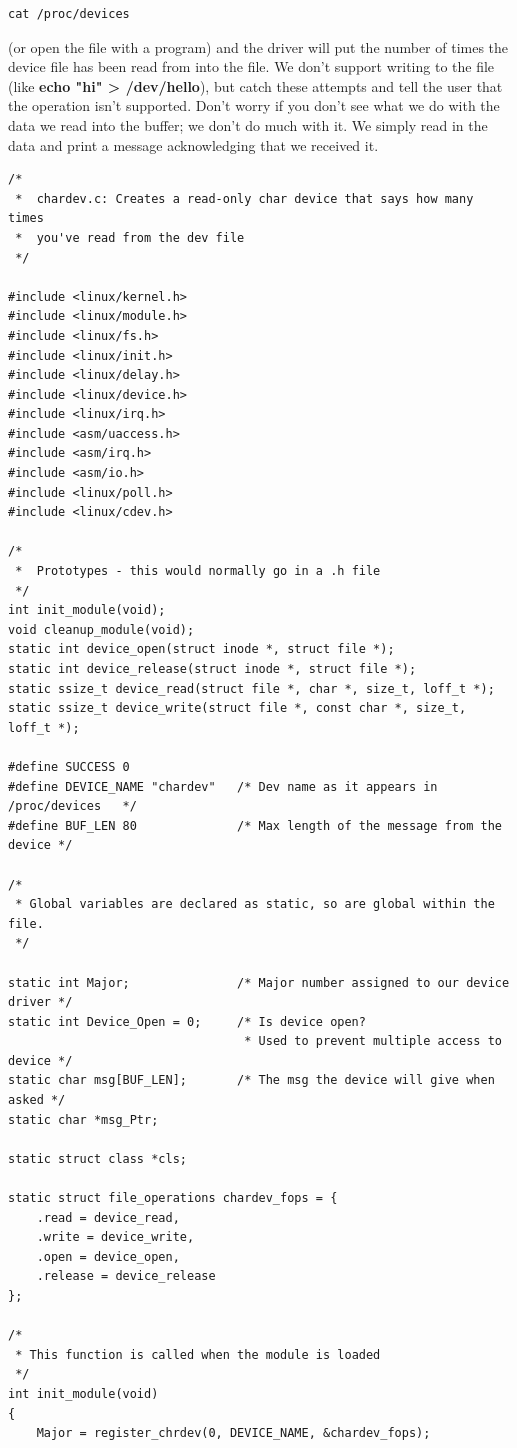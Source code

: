 \documentclass[11pt]{article}
\begin{document}
\begin{verbatim}
cat /proc/devices
\end{verbatim}

(or open the file with a program) and the driver will put the number of times the device file has been read from into the file. We don't support writing to the file (like \textbf{echo "hi" > /dev/hello}), but catch these attempts and tell the user that the operation isn't supported. Don't worry if you don't see what we do with the data we read into the buffer; we don't do much with it. We simply read in the data and print a message acknowledging that we received it.

\begin{verbatim}
/*
 *  chardev.c: Creates a read-only char device that says how many times
 *  you've read from the dev file
 */

#include <linux/kernel.h>
#include <linux/module.h>
#include <linux/fs.h>
#include <linux/init.h>
#include <linux/delay.h>
#include <linux/device.h>
#include <linux/irq.h>
#include <asm/uaccess.h>
#include <asm/irq.h>
#include <asm/io.h>
#include <linux/poll.h>
#include <linux/cdev.h>

/*
 *  Prototypes - this would normally go in a .h file
 */
int init_module(void);
void cleanup_module(void);
static int device_open(struct inode *, struct file *);
static int device_release(struct inode *, struct file *);
static ssize_t device_read(struct file *, char *, size_t, loff_t *);
static ssize_t device_write(struct file *, const char *, size_t, loff_t *);

#define SUCCESS 0
#define DEVICE_NAME "chardev"   /* Dev name as it appears in /proc/devices   */
#define BUF_LEN 80              /* Max length of the message from the device */

/*
 * Global variables are declared as static, so are global within the file.
 */

static int Major;               /* Major number assigned to our device driver */
static int Device_Open = 0;     /* Is device open?
                                 * Used to prevent multiple access to device */
static char msg[BUF_LEN];       /* The msg the device will give when asked */
static char *msg_Ptr;

static struct class *cls;

static struct file_operations chardev_fops = {
    .read = device_read,
    .write = device_write,
    .open = device_open,
    .release = device_release
};

/*
 * This function is called when the module is loaded
 */
int init_module(void)
{
    Major = register_chrdev(0, DEVICE_NAME, &chardev_fops);


\end{verbatim}
\end{document}

